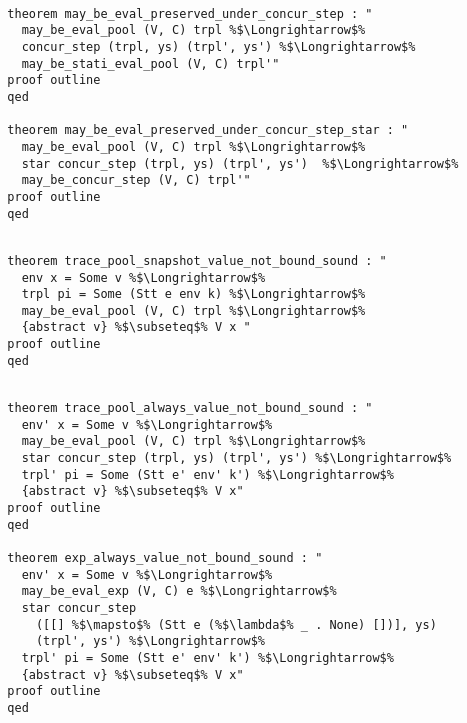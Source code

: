 \documentclass{article}
\begin{document}
\begin{lstlisting}[style=codestyle1, escapechar=\%]

  theorem may_be_eval_preserved_under_concur_step : "
    may_be_eval_pool (V, C) trpl %$\Longrightarrow$% 
    concur_step (trpl, ys) (trpl', ys') %$\Longrightarrow$%
    may_be_stati_eval_pool (V, C) trpl'"
  proof outline
  qed

  theorem may_be_eval_preserved_under_concur_step_star : "
    may_be_eval_pool (V, C) trpl %$\Longrightarrow$% 
    star concur_step (trpl, ys) (trpl', ys')  %$\Longrightarrow$% 
    may_be_concur_step (V, C) trpl'"
  proof outline
  qed
  \end{lstlisting}

\begin{lstlisting}[style=codestyle1, escapechar=\%]

  theorem trace_pool_snapshot_value_not_bound_sound : "
    env x = Some v %$\Longrightarrow$%
    trpl pi = Some (Stt e env k) %$\Longrightarrow$%
    may_be_eval_pool (V, C) trpl %$\Longrightarrow$%
    {abstract v} %$\subseteq$% V x "
  proof outline
  qed
  \end{lstlisting}

\begin{lstlisting}[style=codestyle1, escapechar=\%]

  theorem trace_pool_always_value_not_bound_sound : "
    env' x = Some v %$\Longrightarrow$%
    may_be_eval_pool (V, C) trpl %$\Longrightarrow$% 
    star concur_step (trpl, ys) (trpl', ys') %$\Longrightarrow$%
    trpl' pi = Some (Stt e' env' k') %$\Longrightarrow$%
    {abstract v} %$\subseteq$% V x"
  proof outline
  qed

  theorem exp_always_value_not_bound_sound : "
    env' x = Some v %$\Longrightarrow$%
    may_be_eval_exp (V, C) e %$\Longrightarrow$%
    star concur_step
      ([[] %$\mapsto$% (Stt e (%$\lambda$% _ . None) [])], ys)
      (trpl', ys') %$\Longrightarrow$%
    trpl' pi = Some (Stt e' env' k') %$\Longrightarrow$%
    {abstract v} %$\subseteq$% V x"
  proof outline
  qed

  \end{lstlisting}
\end{document}
